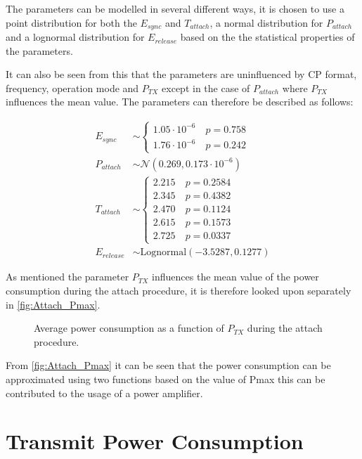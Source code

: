 The parameters can be modelled in several different ways, it is chosen to use a point distribution for both the $E_{sync}$ and $T_{attach}$, a normal distribution for $P_{attach}$ and a lognormal distribution for $E_{release}$ based on the the statistical properties of the parameters. 

It can also be seen from this that the parameters are uninfluenced by CP format, frequency, operation mode and $P_{TX}$ except in the case of $P_{attach}$ where $P_{TX}$ influences the mean value. The parameters can therefore be described as follows:

\begin{align}
E_{sync} &\sim\begin{cases} 1.05\cdot 10^{-6} \quad p = 0.758\\
1.76\cdot 10^{-6} \quad p = 0.242
\end{cases}\\
P_{attach} &\sim\mathcal{N}(0.269,0.173\cdot 10^{-6}) \\
T_{attach} &\sim\begin{cases} 2.215 \quad p = 0.2584\\
2.345 \quad p = 0.4382\\
2.470 \quad p = 0.1124\\
2.615 \quad p = 0.1573\\
2.725 \quad p = 0.0337
\end{cases}\\
E_{release} &\sim \text{Lognormal}(-3.5287,0.1277)
\end{align}

As mentioned the parameter $P_{TX}$ influences the mean value of the power consumption during the attach procedure, it is therefore looked upon separately in \autoref{fig:Attach_Pmax}. 

\begin{figure}[H]
\centering
{}
\resizebox{0.7\textwidth}{!}{
}
\caption{Average power consumption as a function of $P_{TX}$ during the attach procedure.}
\label{fig:Attach_Pmax}
\end{figure}

From \autoref{fig:Attach_Pmax} it can be seen that the power consumption can be approximated using two functions based on the value of Pmax this can be contributed to the usage of a power amplifier. 



\section{Transmit Power Consumption}

